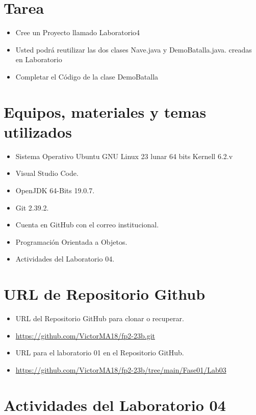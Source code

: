 \documentclass{article}
\begin{document}
	\section{Tarea}
	\begin{itemize}		
        \item Cree un Proyecto llamado Laboratorio4
		\item Usted podrá reutilizar las dos clases Nave.java y DemoBatalla.java. creadas en Laboratorio
		\item Completar el Código de la clase DemoBatalla
	\end{itemize}

	\section{Equipos, materiales y temas utilizados}
	\begin{itemize}
		\item Sistema Operativo Ubuntu GNU Linux 23 lunar 64 bits Kernell 6.2.v
		\item Visual Studio Code.
		\item OpenJDK 64-Bits 19.0.7.
		\item Git 2.39.2.
		\item Cuenta en GitHub con el correo institucional.
		\item Programación Orientada a Objetos.
		\item Actividades del Laboratorio 04.	
	\end{itemize}
	
	\section{URL de Repositorio Github}
	\begin{itemize}
		\item URL del Repositorio GitHub para clonar o recuperar.
		\item \url{https://github.com/VictorMA18/fp2-23b.git}
		\item URL para el laboratorio 01 en el Repositorio GitHub.
		\item \url{https://github.com/VictorMA18/fp2-23b/tree/main/Fase01/Lab03}
	\end{itemize}
	
	\section{Actividades del Laboratorio 04}
	
\end{document}
